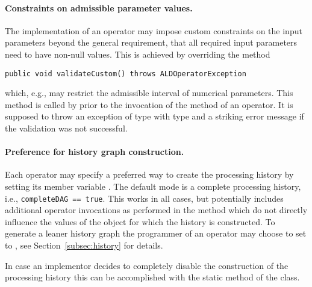 \paragraph{Constraints on admissible parameter values.}

The implementation of an operator may impose 
custom constraints on the input parameters
beyond the general requirement, that all required input parameters
need to have non-null values.
This is achieved by overriding the method \\
\begin{lstlisting}[xrightmargin=.00\textwidth, xleftmargin=.0\textwidth,frame=single,numbers=none]
  public void validateCustom() throws ALDOperatorException
\end{lstlisting}
which, e.g., may restrict the admissible interval of numerical parameters.
This method is called by  prior to the invocation of the
 method of an operator. It is supposed to throw an exception
of type  with type  and
a striking error message if the validation was not successful.

\paragraph{Preference for history graph construction.}
Each operator may specify a preferred
way to create the processing history by setting
its member variable .
The default mode is a complete processing history,
i.e., \texttt{completeDAG == true}. This works in all cases,
but potentially includes additional operator invocations as performed in the
 method which do not directly influence
the values of the object for which the history is constructed.
To generate a leaner history graph the programmer of an operator
may choose to set  to , see
Section~\ref{subsec:history} for details.

In case an implementor decides to completely disable the construction of the processing history 
this can be accomplished with the static method  of
the  class.


